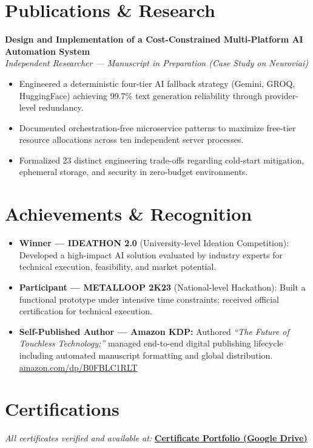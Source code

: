 \documentclass[11pt]{article}
\begin{document}
\section*{Publications \& Research}

\textbf{Design and Implementation of a Cost-Constrained Multi-Platform AI Automation System} \\
\textit{Independent Researcher --- Manuscript in Preparation (Case Study on Neuroviai)}
\begin{itemize}
  \item Engineered a deterministic four-tier AI fallback strategy (Gemini, GROQ, HuggingFace) achieving 99.7\% text generation reliability through provider-level redundancy.
  \item Documented orchestration-free microservice patterns to maximize free-tier resource allocations across ten independent server processes.
  \item Formalized 23 distinct engineering trade-offs regarding cold-start mitigation, ephemeral storage, and security in zero-budget environments.
\end{itemize}

\section*{Achievements \& Recognition}

\begin{itemize}
  \item \textbf{Winner --- IDEATHON 2.0} (University-level Ideation Competition): Developed a high-impact AI solution evaluated by industry experts for technical execution, feasibility, and market potential.
  \item \textbf{Participant --- METALLOOP 2K23} (National-level Hackathon): Built a functional prototype under intensive time constraints; received official certification for technical execution.
  \item \textbf{Self-Published Author --- Amazon KDP:} Authored \textit{``The Future of Touchless Technology;''} managed end-to-end digital publishing lifecycle including automated manuscript formatting and global distribution. \href{https://www.amazon.com/dp/B0FBLC1RLT}{amazon.com/dp/B0FBLC1RLT}
\end{itemize}

\section*{Certifications}
\textit{All certificates verified and available at:} \href{https://drive.google.com/drive/folders/1ZQd-DeX-rXlEVDTwDJfjLjnG7iPc_fEw}{\textbf{Certificate Portfolio (Google Drive)}}
\end{document}
